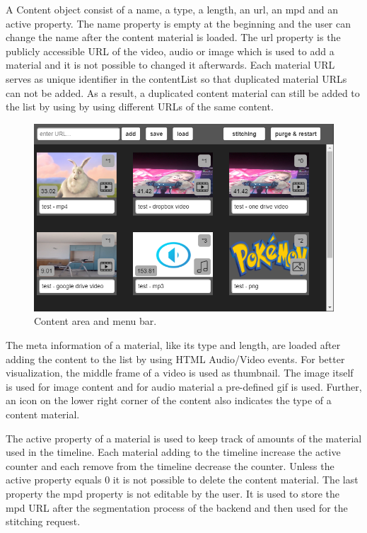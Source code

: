 \documentclass[conference]{IEEEtran}
\begin{document}
A Content object consist of a name, a type, a length, an url, an mpd and an active property.
The name property is empty at the beginning and the user can change the name after the content material is loaded.
The url property is the publicly accessible URL of the video, audio or image which is used to add a material and it is not possible to changed it afterwards.
Each material URL serves as unique identifier in the contentList so that duplicated material URLs can not be added.
As a result, a duplicated content material can still be added to the list by using by using different URLs of the same content.
\begin{figure}[H]
\centering
\includegraphics[scale=0.46]{content_area.png}
\caption{Content area and menu bar.}
\end{figure}
The meta information of a material, like its type and length, are loaded after adding the content to the list by using HTML Audio/Video events.
For better visualization, the middle frame of a video is used as thumbnail.
The image itself is used for image content and for audio material a pre-defined gif is used.
Further, an icon on the lower right corner of the content also indicates the type of a content material.

The active property of a material is used to keep track of amounts of the material used in the timeline. Each material adding to the timeline increase the active counter and each remove from the timeline decrease the counter. Unless the active property equals 0 it is not possible to delete the content material. The last property the mpd property is not editable by the user. It is used to store the mpd URL after the segmentation process of the backend and then used for the stitching request.
\end{document}
